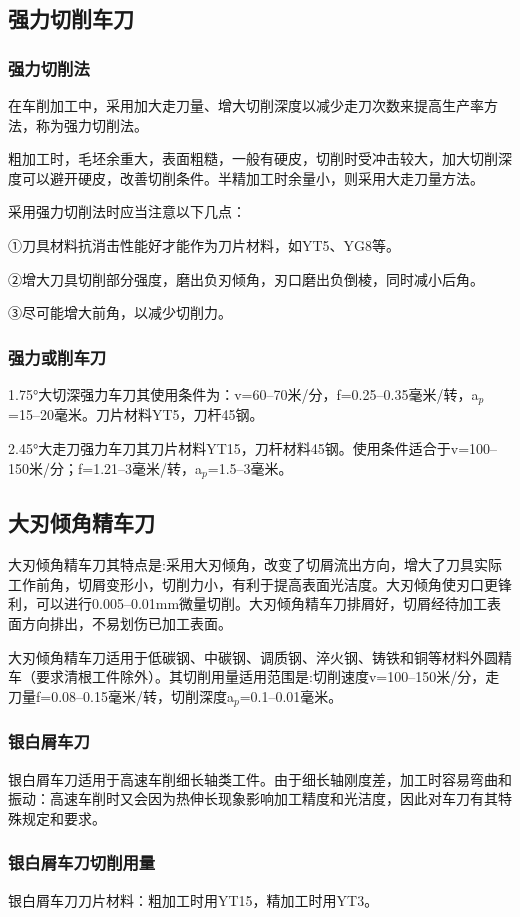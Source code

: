 \documentclass{ctexbook}
\begin{document}
\subsection{强力切削车刀}
\subsubsection{强力切削法}
在车削加工中，采用加大走刀量、增大切削深度以减少走刀次数来提高生产率方法，称为强力切削法。

粗加工时，毛坯余重大，表面粗糙，一般有硬皮，切削时受冲击较大，加大切削深度可以避开硬皮，改善切削条件。半精加工时余量小，则采用大走刀量方法。

采用强力切削法时应当注意以下几点：

①刀具材料抗消击性能好才能作为刀片材料，如YT5、YG8等。

②增大刀具切削部分强度，磨出负刃倾角，刃口磨出负倒棱，同时减小后角。

③尽可能增大前角，以减少切削力。
\subsubsection{强力或削车刀}
1.75°大切深强力车刀其使用条件为：v=60--70米/分，f=0.25--0.35毫米/转，a$_{p}$=15--20毫米。刀片材料YT5，刀杆45钢。

2.45°大走刀强力车刀其刀片材料YT15，刀杆材料45钢。使用条件适合于v=100--150米/分；f=1.21--3毫米/转，a$_p$=1.5--3毫米。
\subsection{大刃倾角精车刀}
大刃倾角精车刀其特点是:采用大刃倾角，改变了切屑流出方向，增大了刀具实际工作前角，切屑变形小，切削力小，有利于提高表面光洁度。大刃倾角使刃口更锋利，可以进行0.005--0.01mm微量切削。大刃倾角精车刀排屑好，切屑经待加工表面方向排出，不易划伤已加工表面。

大刃倾角精车刀适用于低碳钢、中碳钢、调质钢、淬火钢、铸铁和铜等材料外圆精车（要求清根工件除外）。其切削用量适用范围是:切削速度v=100--150米/分，走刀量f=0.08--0.15毫米/转，切削深度a$_p$=0.1--0.01毫米。
\subsubsection{银白屑车刀}
银白屑车刀适用于高速车削细长轴类工件。由于细长轴刚度差，加工时容易弯曲和振动：高速车削时又会因为热伸长现象影响加工精度和光洁度，因此对车刀有其特殊规定和要求。
\subsubsection{银白屑车刀切削用量}
银白屑车刀刀片材料：粗加工时用YT15，精加工时用YT3。
\end{document}

